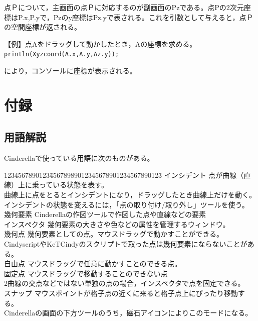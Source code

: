 \documentclass[papersize,a4paper,12pt,uplatex]{jsarticle}
\begin{document}
\begin{description}
  点Ｐについて，主画面の点Ｐに対応するのが副画面のPzである。点Pの2次元座標はP.x,P.yで，Pzのy座標はPz.yで表される。これを引数として与えると，点Ｐの空間座標が返される。
  
\vspace{\baselineskip}
【例】点Aをドラッグして動かしたとき，Aの座標を求める。
\verb|println(Xyzcoord(A.x,A.y,Az.y));|
  
により，コンソールに座標が表示される。

\end{description}
\newpage

\section{付録}

\subsection{用語解説} 
Cinderellaで使っている用語に次のものがある。
\begin{tabbing}
1234567890123\=456789890123456789012\=34567890123\=\kill
インシデント  \>点が曲線（直線）上に乗っている状態を表す。\\
  \>曲線上に点をとるとインシデントになり，ドラッグしたとき曲線上だけを動く。\\
  \>インシデントの状態を変えるには，「点の取り付け/取り外し」ツールを使う。\\
幾何要素      \>Cinderellaの作図ツールで作図した点や直線などの要素\\
インスペクタ  \>幾何要素の大きさや色などの属性を管理するウィンドウ。\\
幾何点    \>幾何要素としての点。マウスドラッグで動かすことができる。\\
  \>CindyscriptやKeTCindyのスクリプトで取った点は幾何要素にならないことがある。\\
自由点  \>マウスドラッグで任意に動かすことのできる点。\\
固定点  \>マウスドラッグで移動することのできない点\\
  \>2曲線の交点などではない単独の点の場合，インスペクタで点を固定できる。\\ 
スナップ    \>マウスポイントが格子点の近くに来ると格子点上にぴったり移動する。\\
  \>Cinderellaの画面の下方ツールのうち，磁石アイコンによりこのモードになる。\\
 \end{tabbing}
 
\end{document}
